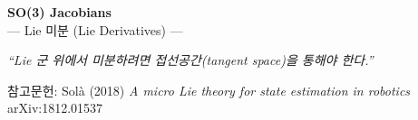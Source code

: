\begin{frame}
  \begin{center}
    {\LARGE \textbf{SO(3) Jacobians}}\\[0.5em]
    {\large --- Lie 미분 (Lie Derivatives) ---}\\[1.5em]
    \begin{block}{}
      \centering
      \textit{``Lie 군 위에서 미분하려면 접선공간(tangent space)을 통해야 한다.''}
    \end{block}
    \vspace{1em}
    {\small 참고문헌: Solà (2018) \textit{A micro Lie theory for state estimation in robotics} \\ arXiv:1812.01537}
  \end{center}
\end{frame}


